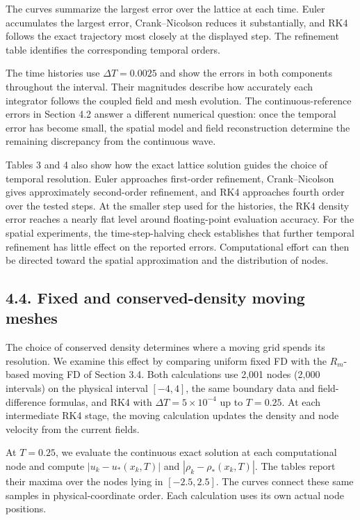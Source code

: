 \documentclass[11pt,a4paper]{article}
\begin{document}
The curves summarize the largest error over the lattice at each time. Euler accumulates the largest error, Crank–Nicolson reduces it substantially, and RK4 follows the exact trajectory most closely at the displayed step. The refinement table identifies the corresponding temporal orders.

The time histories use \(\Delta T=0.0025\) and show the errors in both components throughout the interval. Their magnitudes describe how accurately each integrator follows the coupled field and mesh evolution. The continuous-reference errors in Section 4.2 answer a different numerical question: once the temporal error has become small, the spatial model and field reconstruction determine the remaining discrepancy from the continuous wave.

Tables 3 and 4 also show how the exact lattice solution guides the choice of temporal resolution. Euler approaches first-order refinement, Crank–Nicolson gives approximately second-order refinement, and RK4 approaches fourth order over the tested steps. At the smaller step used for the histories, the RK4 density error reaches a nearly flat level around floating-point evaluation accuracy. For the spatial experiments, the time-step-halving check establishes that further temporal refinement has little effect on the reported errors. Computational effort can then be directed toward the spatial approximation and the distribution of nodes.

\FloatBarrier
\subsection*{4.4. Fixed and conserved-density moving meshes}

The choice of conserved density determines where a moving grid spends its resolution. We examine this effect by comparing uniform fixed FD with the \(R_m\)-based moving FD of Section 3.4. Both calculations use 2,001 nodes (2,000 intervals) on the physical interval \([-4,4]\), the same boundary data and field-difference formulas, and RK4 with \(\Delta T=5\times10^{-4}\) up to \(T=0.25\). At each intermediate RK4 stage, the moving calculation updates the density and node velocity from the current fields.

At \(T=0.25\), we evaluate the continuous exact solution at each computational node and compute \(|u_k-u_*(x_k,T)|\) and \(|\rho_k-\rho_*(x_k,T)|\). The tables report their maxima over the nodes lying in \([-2.5,2.5]\). The curves connect these same samples in physical-coordinate order. Each calculation uses its own actual node positions.
\end{document}
